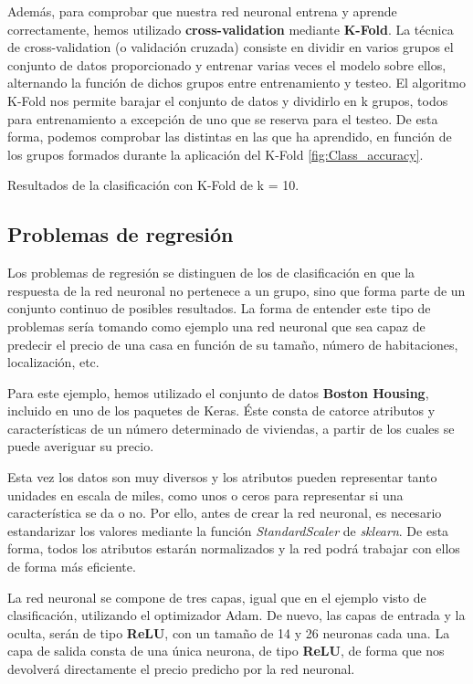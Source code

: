 Además, para comprobar que nuestra red neuronal entrena y aprende correctamente, hemos utilizado \textbf{cross-validation} mediante \textbf{K-Fold}. La técnica de cross-validation (o validación cruzada) consiste en dividir en varios grupos el conjunto de datos proporcionado y entrenar varias veces el modelo sobre ellos, alternando la función de dichos grupos entre entrenamiento y testeo. El algoritmo K-Fold nos permite barajar el conjunto de datos y dividirlo en k grupos, todos para entrenamiento a excepción de uno que se reserva para el testeo. De esta forma, podemos comprobar las distintas en las que ha aprendido, en función de los grupos formados durante la aplicación del K-Fold \ref{fig:Class_accuracy}.

%
        {Resultados de la clasificación con K-Fold de k = 10.}

\subsection{Problemas de regresión}
Los problemas de regresión se distinguen de los de clasificación en que la respuesta de la red neuronal no pertenece a un grupo, sino que forma parte de un conjunto continuo de posibles resultados. La forma de entender este tipo de problemas sería tomando como ejemplo una red neuronal que sea capaz de predecir el precio de una casa en función de su tamaño, número de habitaciones, localización, etc.

Para este ejemplo, hemos utilizado el conjunto de datos \textbf{Boston Housing}, incluido en uno de los paquetes de Keras. Éste consta de catorce atributos y características de un número determinado de viviendas, a partir de los cuales se puede averiguar su precio. 

Esta vez los datos son muy diversos y los atributos pueden representar tanto unidades en escala de miles, como unos o ceros para representar si una característica se da o no. Por ello, antes de crear la red neuronal, es necesario estandarizar los valores mediante la función \textit{StandardScaler} de \textit{sklearn}. De esta forma, todos los atributos estarán normalizados y la red podrá trabajar con ellos de forma más eficiente.

La red neuronal se compone de tres capas, igual que en el ejemplo visto de clasificación, utilizando el optimizador Adam. De nuevo, las capas de entrada y la oculta, serán de tipo \textbf{ReLU}, con un tamaño de 14 y 26 neuronas cada una. La capa de salida consta de una única neurona, de tipo \textbf{ReLU}, de forma que nos devolverá directamente el precio predicho por la red neuronal. 

